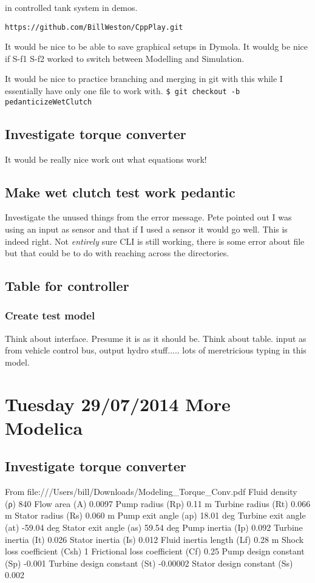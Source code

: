 \documentclass[11pt, oneside]{article}   	%
\begin{document}
in controlled tank system in demos.

\verb+https://github.com/BillWeston/CppPlay.git+

It would be nice to be able to save graphical setups in Dymola.
It wouldg be nice if S-f1 S-f2 worked to switch between Modelling and Simulation.

It would be nice to practice branching and merging in git with this
while I essentially have only one file to work with.
\verb+$ git checkout -b pedanticizeWetClutch+

\subsection{Investigate torque converter}
It would be really nice work out what equations work!
\subsection{Make wet clutch test work pedantic}
Investigate the unused things from the error message.
Pete pointed out I was using an input as sensor and that if I used a
sensor it would go well.   This is indeed right.   Not {\em entirely}
sure CLI is still working, there is some error about file but that
could be to do with reaching across the directories.
\subsection{Table for controller}
\subsubsection{Create test model}
Think about interface.  Presume it is as it should be.  Think about table.  
input as from vehicle control bus, output hydro stuff..... lots of
meretricious typing in this model.

\section{Tuesday 29/07/2014  More Modelica}
\subsection{Investigate torque converter}
From file:///Users/bill/Downloads/Modeling_Torque_Conv.pdf
Fluid density (ρ) 840 
Flow area (A) 0.0097 
Pump radius (Rp) 0.11 m 
Turbine radius (Rt) 0.066 m 
Stator radius (Rs) 0.060 m
Pump exit angle (ap) 18.01 deg
Turbine exit angle (at) -59.04 deg
Stator exit angle (as) 59.54 deg
Pump inertia (Ip) 0.092 
Turbine inertia (It) 0.026 
Stator inertia (Is) 0.012 
Fluid inertia length (Lf) 0.28 m
Shock loss coefficient (Csh) 1
Frictional loss coefficient (Cf) 0.25
Pump design constant (Sp) -0.001 
Turbine design constant (St) -0.00002 
Stator design constant (Ss) 0.002
\end{document}

